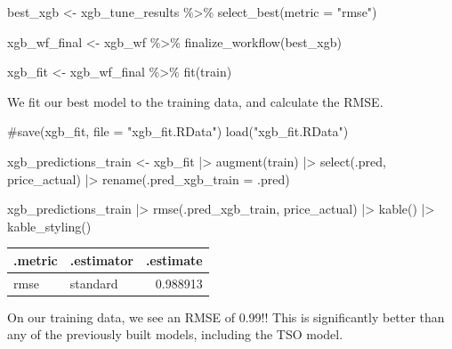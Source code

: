 \documentclass[
]{article}
\newenvironment{Shaded}{\begin{snugshade}}{\end{snugshade}}
\newcommand{\AttributeTok}[1]{\textcolor[rgb]{0.40,0.45,0.13}{#1}}
\newcommand{\CommentTok}[1]{\textcolor[rgb]{0.37,0.37,0.37}{#1}}
\newcommand{\FunctionTok}[1]{\textcolor[rgb]{0.28,0.35,0.67}{#1}}
\newcommand{\NormalTok}[1]{\textcolor[rgb]{0.00,0.23,0.31}{#1}}
\newcommand{\OtherTok}[1]{\textcolor[rgb]{0.00,0.23,0.31}{#1}}
\newcommand{\SpecialCharTok}[1]{\textcolor[rgb]{0.37,0.37,0.37}{#1}}
\newcommand{\StringTok}[1]{\textcolor[rgb]{0.13,0.47,0.30}{#1}}
\begin{document}
\begin{Shaded}
\begin{Highlighting}[]
\NormalTok{best\_xgb }\OtherTok{\textless{}{-}}\NormalTok{ xgb\_tune\_results }\SpecialCharTok{\%\textgreater{}\%}
  \FunctionTok{select\_best}\NormalTok{(}\AttributeTok{metric =} \StringTok{"rmse"}\NormalTok{)}

\NormalTok{xgb\_wf\_final }\OtherTok{\textless{}{-}}\NormalTok{ xgb\_wf }\SpecialCharTok{\%\textgreater{}\%}
  \FunctionTok{finalize\_workflow}\NormalTok{(best\_xgb)}

\NormalTok{xgb\_fit }\OtherTok{\textless{}{-}}\NormalTok{ xgb\_wf\_final }\SpecialCharTok{\%\textgreater{}\%}
  \FunctionTok{fit}\NormalTok{(train)}
\end{Highlighting}
\end{Shaded}

We fit our best model to the training data, and calculate the RMSE.

\begin{Shaded}
\begin{Highlighting}[]
\CommentTok{\#save(xgb\_fit, file = "xgb\_fit.RData")}
\FunctionTok{load}\NormalTok{(}\StringTok{"xgb\_fit.RData"}\NormalTok{)}

\NormalTok{xgb\_predictions\_train }\OtherTok{\textless{}{-}}\NormalTok{ xgb\_fit }\SpecialCharTok{|\textgreater{}}
  \FunctionTok{augment}\NormalTok{(train) }\SpecialCharTok{|\textgreater{}}
  \FunctionTok{select}\NormalTok{(.pred, price\_actual) }\SpecialCharTok{|\textgreater{}}
  \FunctionTok{rename}\NormalTok{(}\AttributeTok{.pred\_xgb\_train =}\NormalTok{ .pred)}

\NormalTok{xgb\_predictions\_train }\SpecialCharTok{|\textgreater{}}
  \FunctionTok{rmse}\NormalTok{(.pred\_xgb\_train, price\_actual) }\SpecialCharTok{|\textgreater{}}
  \FunctionTok{kable}\NormalTok{() }\SpecialCharTok{|\textgreater{}}
  \FunctionTok{kable\_styling}\NormalTok{()}
\end{Highlighting}
\end{Shaded}

\begin{longtable*}[t]{llr}
\toprule
.metric & .estimator & .estimate\\
\midrule
rmse & standard & 0.988913\\
\bottomrule
\end{longtable*}

On our training data, we see an RMSE of 0.99!! This is significantly
better than any of the previously built models, including the TSO model.
\end{document}
